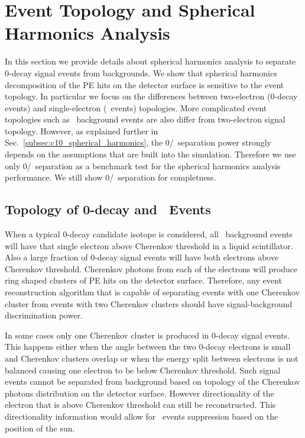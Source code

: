 \section{Event Topology and Spherical Harmonics Analysis}
\label{sec:topology_and_harmonics}

In this section we provide details about spherical harmonics analysis to separate 0\nbb-decay signal events from backgrounds. 
We show that spherical harmonics decomposition of the PE hits on the detector surface is sensitive to the event topology. In particular
we focus on the differences between two-electron (0\nbb-decay events) and single-electron (\B~events) topologies. More complicated 
event topologies such as \C~background events are also differ from two-electron signal topology. However, as explained further in 
Sec.~\ref{subsec:c10_spherical_harmonics}, the 0\nbb/\C~separation power strongly depends on the assumptions that are built into the 
simulation. Therefore we use only 0\nbb/\B~separation as a benchmark test for the spherical harmonics analysis performance. We still 
show 0\nbb/\C~separation for completness.


\subsection{Topology of 0\nbb-decay and \B~Events}
\label{subsec:topology}

When a typical 0\nbb-decay candidate isotope is considered, all \B~background events will have that single electron above Cherenkov threshold
in a liquid scintillator. Also a large fraction of 0\nbb-decay signal events will have both electrons above Cherenkov threshold. Cherenkov photons
from each of the electrons will produce ring shaped clusters of PE hits on the detector surface. Therefore, any event reconstruction algorithm 
that is capable of separating events with one Cherenkov cluster from events with two Cherenkov clusters should have signal-background 
discrimination power. 

In some cases only one Cherenkov cluster is produced in 0\nbb-decay signal events. This happens either when the angle between the two 
0\nbb-decay electrons is small and Cherenkov clusters overlap or when the energy split between electrons is not balanced causing 
one electron to be below Cherenkov threshold.
Such signal events cannot be separated from background based on topology of the Cherenkov photons distribution on the detector surface. 
However directionality of the electron that is above Cherenkov threshold can still be reconstructed. This directionality information would allow
for \B~events suppression based on the position of the sun.

